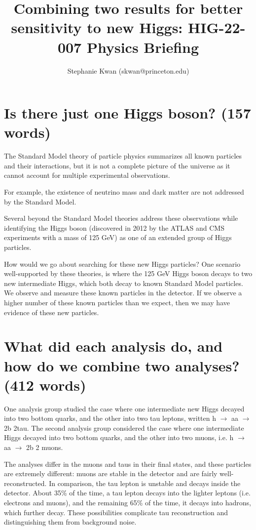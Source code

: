 \documentclass{article}
\title{Combining two results for better sensitivity to new Higgs: HIG-22-007 Physics Briefing}
\author{Stephanie Kwan (skwan@princeton.edu)}
\begin{document}
\maketitle


\section{Is there just one Higgs boson? (157 words)}

The Standard Model theory of particle physics summarizes all known particles and their interactions, but it is not a complete picture of the universe as it cannot account for multiple experimental observations. 

For example, the existence of neutrino mass and dark matter are not addressed by the Standard Model. 

Several beyond the Standard Model theories address these observations while identifying the Higgs boson (discovered in 2012 by the ATLAS and CMS experiments with a mass of 125 GeV) as one of an extended group of Higgs particles. 

How would we go about searching for these new Higgs particles? One scenario well-supported by these theories, is where the 125 GeV Higgs boson decays to two new intermediate Higgs,
which both decay to known Standard Model particles. We observe and measure these known particles in the detector. If we observe a higher number of these known particles than we expect, then we may have evidence of these new particles. 


\section{What did each analysis do, and how do we combine two analyses? (412 words)}

One analysis group studied the case where one intermediate new Higgs decayed into two bottom quarks, and the other into two tau leptons, written h $\rightarrow$ aa $\rightarrow$ 2b 2tau.
The second analysis group considered the case where one intermediate Higgs decayed into two bottom quarks, and the other into two muons, i.e. h $\rightarrow$ aa $\rightarrow$ 2b 2 muons. 

The analyses differ in the muons and taus in their final states, and these particles are extremely different: muons are stable in the detector and are fairly well-reconstructed. 
In comparison, the tau lepton is unstable and decays inside the detector. About 35\% of the time, a tau lepton decays into the lighter leptons (i.e. electrons and muons), and the remaining 65\% of the time, it decays into hadrons, 
which further decay. These possibilities complicate tau reconstruction and distinguishing them from background noise. 
\end{document}
